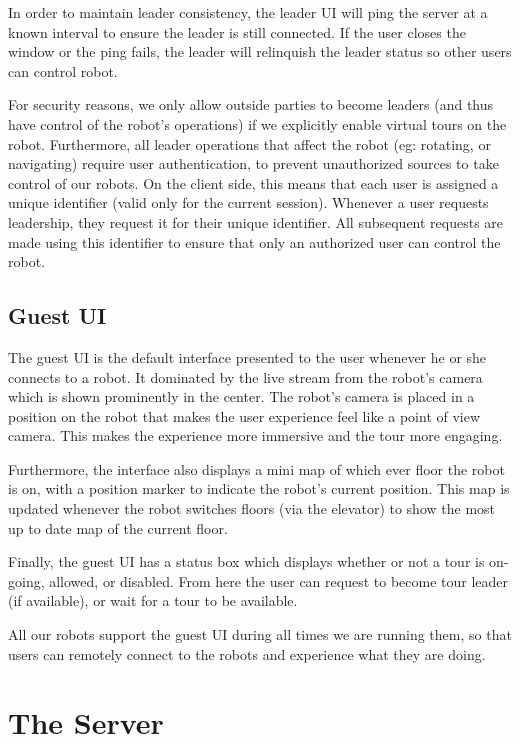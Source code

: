 \documentclass{sig-alternate-05-2015}
\begin{document}
In order to maintain leader consistency, the leader UI will ping the server at
a known interval to ensure the leader is still connected. If the user closes
the window or the ping fails, the leader will relinquish the leader status so
other users can control robot.

For security reasons, we only allow outside parties to become leaders (and thus
have control of the robot's operations) if we explicitly enable virtual tours
on the robot. Furthermore, all leader operations that affect the robot (eg:
rotating, or navigating) require user authentication, to prevent unauthorized
sources to take control of our robots. On the client side, this means that each
user is assigned a unique identifier (valid only for the current session).
Whenever a user requests leadership, they request it for their unique
identifier. All subsequent requests are made using this identifier to ensure
that only an authorized user can control the robot.

\subsection{Guest UI}

The guest UI is the default interface presented to the user whenever he or she
connects to a robot. It dominated by the live stream from the robot's camera
which is shown prominently in the center. The robot's camera is placed in a
position on the robot that makes the user experience feel like a point of view
camera. This makes the experience more immersive and the tour more engaging.

Furthermore, the interface also displays a mini map of which ever floor the
robot is on, with a position marker to indicate the robot's current position.
This map is updated whenever the robot switches floors (via the elevator) to
show the most up to date map of the current floor.

Finally, the guest UI has a status box which displays whether or not a tour is
on-going, allowed, or disabled. From here the user can request to become tour
leader (if available), or wait for a tour to be available.

All our robots support the guest UI during all times we are running them, so
that users can remotely connect to the robots and experience what they are
doing.

\section{The Server}
\end{document}
